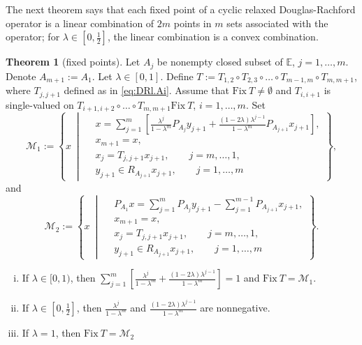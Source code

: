 \documentclass[12pt]{article}
\theoremstyle{definition}
\newtheorem{theorem}{Theorem}
\renewcommand{\equiv}{:=}
\newcommand{\Fix}{\mathrm{Fix}\ }
\begin{document}
The next theorem says that each fixed point of a cyclic relaxed Douglas-Rachford operator is a linear combination of $2m$ points in $m$ sets associated with the operator; for
$\lambda\in[0,\frac{1}{2}]$, the linear combination is a convex combination.
\begin{theorem}[fixed points]\label{theo:characterization.fix.T}
Let $A_j$ be nonempty closed subset of $\mathbb E$, $j=1,\dots,m$.
Denote $A_{m+1}:=A_1$.
Let $\lambda\in [0,1]$.
Define $T\equiv T_{1,2}\circ T_{2,3}\circ\dots\circ T_{m-1,m}\circ T_{m,m+1}$, where $T_{j,j+1}$ defined as in \eqref{eq:DRl.Ai}.
Assume that $\Fix T\neq\emptyset$ and 
$T_{i,i+1}$ is single-valued on $T_{i+1,i+2}\circ\dots\circ T_{m,m+1}\Fix T$, $i=1,\dots,m$.
Set
\begin{equation}
    \mathcal{M}_1:=\left\{
    x~\middle|~ 
    \begin{array}{rl}
    &x=\sum_{j=1}^{m}[\frac{\lambda^j}{1-\lambda^m}P_{A_j}y_{j+1}+\frac{(1-2\lambda)\lambda^{j-1}}{1-\lambda^m}P_{A_{j+1}}x_{j+1}],\\
    &x_{m+1}=x,\\
    &x_j=T_{j,j+1}x_{j+1},\qquad j=m,\dots,1,\\
    
    &y_{j+1}\in R_{A_{j+1} }x_{j+1},\qquad j=1,\dots,m
    \end{array}
    \right\},
\end{equation}
and
\begin{equation}
    \mathcal{M}_2:=\left\{
    x~\middle|~ 
    \begin{array}{rl}
    &P_{A_1}x=\sum_{j=1}^{m}P_{A_j}y_{j+1}-\sum_{j=1}^{m-1}P_{A_{j+1}}x_{j+1},\\
    &x_{m+1}=x,\\
    &x_j=T_{j,j+1}x_{j+1},\qquad j=m,\dots,1,\\
    
    &y_{j+1}\in R_{A_{j+1} }x_{j+1},\qquad j=1,\dots,m
    \end{array}
    \right\}.
\end{equation}
\begin{enumerate}[(i)]
    \item\label{theo:characterization.fix.T i} If $\lambda\in [0,1)$, then $\sum_{j=1}^m [\frac{\lambda^j}{1-\lambda^m}+\frac{(1-2\lambda)\lambda^{j-1}}{1-\lambda^m}]=1$ and $\Fix T= \mathcal{M}_1$.
    \item\label{theo:characterization.fix.T ii}
If $\lambda\in[0,\frac{1}{2}]$, then $\frac{\lambda^j}{1-\lambda^m}$ and $\frac{(1-2\lambda)\lambda^{j-1}}{1-\lambda^m}$ are nonnegative.
\item\label{theo:characterization.fix.T iii} If $\lambda=1$, then  $\Fix T = \mathcal{M}_2$
\end{enumerate}
\end{theorem}
\end{document}
